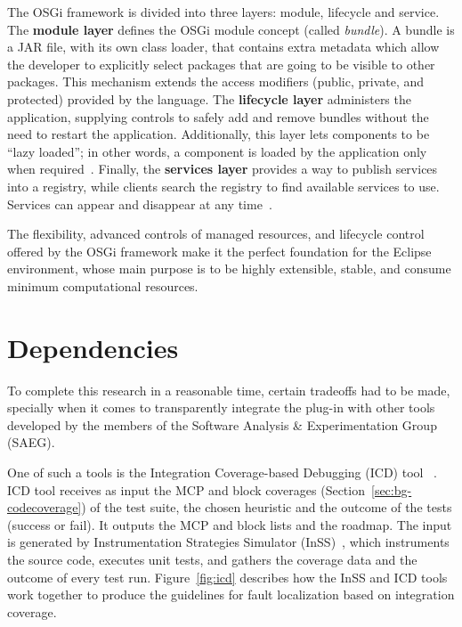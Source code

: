 The OSGi framework is divided into three layers: module, lifecycle and service.
The \textbf{module layer} defines the OSGi module concept (called
\textit{bundle}). A bundle is a JAR file, with its own class loader, that
contains extra metadata which allow the developer to explicitly select packages
that are going to be visible to other packages. This mechanism extends the
access modifiers (public, private, and protected) provided by the language. The
\textbf{lifecycle layer} administers the application, supplying controls to
safely add and remove bundles without the need to restart the application.
Additionally, this layer lets components to be ``lazy loaded''; in other words,
a component is loaded by the application only when
required~\cite{brownwilson2011archoss}. Finally, the \textbf{services layer}
provides a way to publish services into a registry, while clients search the
registry to find available services to use. Services can appear and disappear at
any time~\cite{hall2011osgi, castroalves2011osgi}.

The flexibility, advanced controls of managed resources, and lifecycle control
offered by the OSGi framework make it the perfect foundation for the Eclipse
environment, whose main purpose is to be highly extensible, stable, and consume
minimum computational resources.

\section{Dependencies}\label{sec:dependencies}

To complete this research in a reasonable time, certain tradeoffs had to be
made, specially when it comes to transparently integrate the plug-in with other
tools developed by the members of the Software Analysis \& Experimentation Group
(SAEG).

One of such a tools is the Integration Coverage-based Debugging (ICD) tool
~\cite{souza13adding, souza2012depuracao}. ICD tool receives as input the MCP
and block coverages (Section~\ref{sec:bg-codecoverage}) of the test suite, the
chosen heuristic and the outcome of the tests (success or fail). It outputs the
MCP and block lists and the roadmap.
The input is generated by Instrumentation Strategies Simulator
(InSS)~\cite{souza2012depuracao}, which instruments the source code, executes
unit tests, and gathers the coverage data and the outcome of every test run.
Figure~\ref{fig:icd} describes how the InSS and ICD tools work together to
produce the guidelines for fault localization based on integration coverage.

